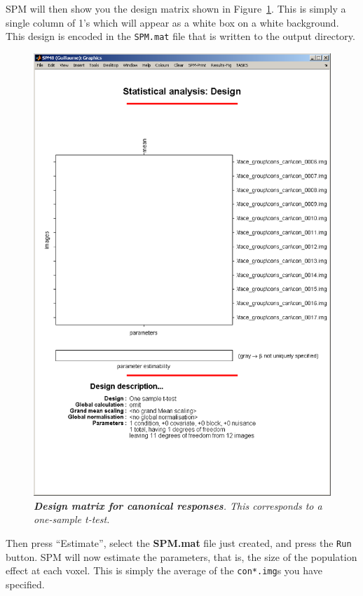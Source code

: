 SPM will then show you the design matrix shown in Figure~\ref{t1}. This is simply a single column of 1's which will appear as a white box on a white background. This design is encoded in the \texttt{SPM.mat} file that is written to the output directory.
\begin{figure}
\begin{center}
\includegraphics[width=140mm]{faces_group/t1}
\caption{\em \textbf{Design matrix for canonical responses}. This corresponds to a one-sample t-test. \label{t1}}
\end{center}
\end{figure}
Then press ``Estimate'', select the \textbf{SPM.mat} file just created, and press the \texttt{Run} button.
SPM will now estimate the parameters, that is, the size of the population effect at each voxel. This is simply the average of the \texttt{con*.img}s you have specified.

